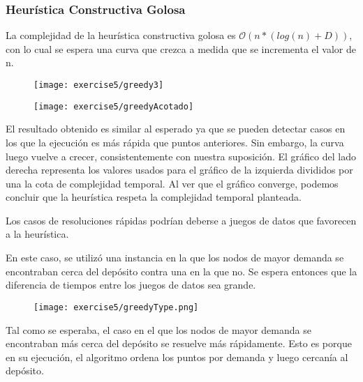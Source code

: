\subsubsection{Heurística Constructiva Golosa}

La complejidad de la heurística constructiva golosa es $\mathcal{O}(n * (log(n) + D))$, con lo cual se espera una curva que crezca a medida que se incrementa el valor de n.

\begin{figure}[H]
	\centering
	\begin{minipage}[t]{.45\textwidth}
		\centering
		\texttt{[image: exercise5/greedy3]}
	\end{minipage}\qquad
	\begin{minipage}[t]{.45\textwidth}
		\centering
		\texttt{[image: exercise5/greedyAcotado]}
	\end{minipage}
\end{figure}

El resultado obtenido es similar al esperado ya que se pueden detectar casos en los que la ejecución es más rápida que puntos anteriores. Sin embargo, la curva luego vuelve a crecer, consistentemente con nuestra suposición. El gráfico del lado derecha representa los valores usados para el gráfico de la izquierda divididos por una la cota de complejidad temporal. Al ver que el gráfico converge, podemos concluir que la heurística respeta la complejidad temporal planteada.

Los casos de resoluciones rápidas podrían deberse a juegos de datos que favorecen a la heurística.




En este caso, se utilizó una instancia en la que los nodos de mayor demanda se encontraban cerca del depósito contra una en la que no. Se espera entonces que la diferencia de tiempos entre los juegos de datos sea grande.

\begin{figure}[H]
	\centering
	\texttt{[image: exercise5/greedyType.png]}
\end{figure}


Tal como se esperaba, el caso en el que los nodos de mayor demanda se encontraban más cerca del depósito se resuelve más rápidamente. Esto es porque en su ejecución, el algoritmo ordena los puntos por demanda y luego cercanía al depósito.
